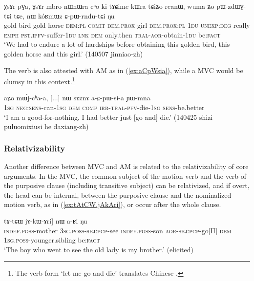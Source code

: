 \begin{exe}
\ex  \label{ex:CpWrndutCi}
\gll χsɤr pɣa, χsɤr mbro nɯnɯra cʰo ki tɤɕime kɯra tɕiʑo rcanɯ, wuma ʑo pɯ-zdɯɣ-tɕi tɕe, nɯ kóʁmɯz ɕ-pɯ-rndu-tɕi ŋu \\
gold bird gold horse \textsc{dem}:\textsc{pl} \textsc{comit} \textsc{dem}.\textsc{prox} girl \textsc{dem}.\textsc{prox}:\textsc{pl} \textsc{1du} \textsc{unexp}:\textsc{deg} really \textsc{emph} \textsc{pst}.\textsc{ipfv}-suffer-\textsc{1du} \textsc{lnk} \textsc{dem} only.then \textsc{tral}-\textsc{aor}-obtain-\textsc{1du} be:\textsc{fact} \\
\glt `We had to endure a lot of hardships before obtaining this golden bird, this golden horse and this girl.' (140507 jinniao-zh)
\end{exe}


The verb  is also attested with AM as in (\ref{ex:aCpWsia}), while a MVC would be clumsy in this context.\footnote{The verb form  `let me go and die' translates Chinese . }

\begin{exe}
\ex  \label{ex:aCpWsia}
\gll aʑo mɯ́j-cʰa-a, [...] nɯ sɤznɤ a-ɕ-pɯ-si-a ɲɯ-mna \\
\textsc{1sg} \textsc{neg}:\textsc{sens}-can-\textsc{1sg} { } \textsc{dem} \textsc{comp} \textsc{irr}-\textsc{tral}-\textsc{pfv}-die-\textsc{1sg} \textsc{sens}-be.better \\
\glt `I am a good-for-nothing, I had better just [go and] die.' (140425 shizi puluomixiusi he daxiang-zh) 
\end{exe}

\subsubsection{Relativizability} \label{sec:AM.mvc.relativizability}
Another difference between MVC and AM is related to the relativizability of core arguments. In the MVC, the common subject of the motion verb and the verb of the purposive clause (including transitive subject) can be relativized, and if overt, the head can be internal, between the purposive clause and the nominalized motion verb, as  in (\ref{ex:tAtCW.jAkAri}), or occur after the whole clause.

\begin{exe}
\ex  \label{ex:tAtCW.jAkAri}
\gll  [[tɤ-mu ɯ-kɯ-rtoʁ] tɤ-tɕɯ jɤ-kɯ-ɤri] nɯ a-ʁi ŋu \\
\textsc{indef}.\textsc{poss}-mother \textsc{3sg}.\textsc{poss}-\textsc{sbj}:\textsc{pcp}-see \textsc{indef}.\textsc{poss}-son \textsc{aor}-\textsc{sbj}:\textsc{pcp}-go[II] \textsc{dem} \textsc{1sg}.\textsc{poss}-younger.sibling be:\textsc{fact} \\
\glt `The boy who went to see the old lady is my brother.' (elicited)
\end{exe}

